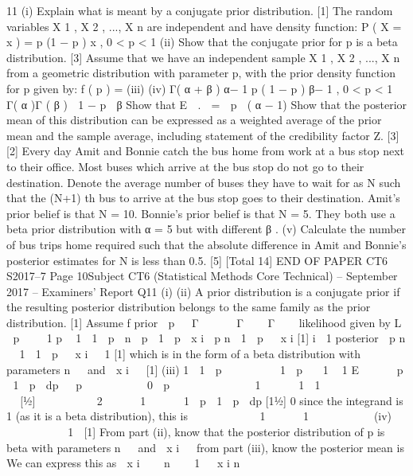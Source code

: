 \documentclass[a4paper,12pt]{article}
\begin{document}
\begin{enumerate}
11
(i)
Explain what is meant by a conjugate prior distribution.
[1]
The random variables X 1 , X 2 , ..., X n are independent and have density function:
P ( X = x ) = p (1 − p ) x , 0 < p < 1
(ii)
Show that the conjugate prior for p is a beta distribution.
[3]
Assume that we have an independent sample X 1 , X 2 , ..., X n from a geometric
distribution with parameter p, with the prior density function for p given by:
f ( p ) =
(iii)
(iv)
Γ( α + β ) α− 1
p ( 1 − p ) β− 1 , 0 < p < 1
Γ( α )Γ ( β )
 1 − p 
β
Show that E 
.
 =
 p  ( α − 1)
Show that the posterior mean of this distribution can be expressed as a
weighted average of the prior mean and the sample average, including
statement of the credibility factor Z.
[3]
[2]
Every day Amit and Bonnie catch the bus home from work at a bus stop next to their
office. Most buses which arrive at the bus stop do not go to their destination. Denote
the average number of buses they have to wait for as N such that the (N+1) th bus to
arrive at the bus stop goes to their destination. Amit’s prior belief is that N = 10.
Bonnie’s prior belief is that N = 5. They both use a beta prior distribution with α = 5
but with different β .
(v)
Calculate the number of bus trips home required such that the absolute
difference in Amit and Bonnie’s posterior estimates for N is less than 0.5. [5]
[Total 14]
END OF PAPER
CT6 S2017–7
Page 10Subject CT6 (Statistical Methods Core Technical) – September 2017 – Examiners’ Report
Q11
(i)
(ii)
A prior distribution is a conjugate prior if the resulting posterior distribution
belongs to the same family as the prior distribution.
[1]
Assume f prior  p  
Γ     
Γ    Γ   
likelihood given by L  p  
 1
p  1  1  p 
n
 p  1  p 
x i
 p n  1  p 
 x i
[1]
i  1
posterior  p n  1  1  p 
 x i  1
[1]
which is in the form of a beta distribution with parameters n   and  x i  
[1]
(iii)
1
 1  p         1  p   1
 1
E 



 p  1  p  dp

 p          0  p 

          1      1  1
       
     
[1⁄2]
     

 2
     1      1  p  1  p  dp
[11⁄2]
0
since the integrand is 1 (as it is a beta distribution), this is
          1      1 
       
(iv)
     


   1 
[1]
From part (ii), know that the posterior distribution of p is beta with parameters
n   and  x i  
from part (iii), know the posterior mean is
We can express this as
 x i  
 n    1 
 x i
n

\end{enumerate}
\end{document}
